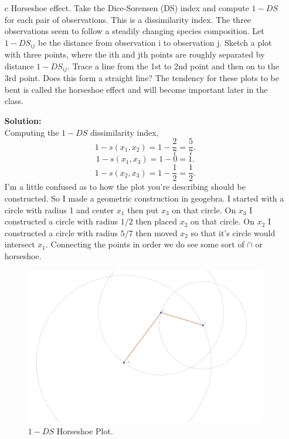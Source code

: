 \documentclass[12pt]{article}
\makeatletter
\theoremstyle{homework}
\newenvironment{exercise}[1]
{\def\@currentlabel{#1}\exercisecore}
{\endexercisecore}
\newcommand{\localhead}[1]{\par\smallskip\noindent\textbf{#1}\nobreak\\}%
\newcommand\solution{\localhead{Solution:}}
\makeatother
\begin{document}
\begin{exercise}{2}
\begin{exercise}{3}
\begin{enumerate}
      \item[c]  Horseshoe effect. Take the Dice-Sorensen (DS) index and compute $1 - DS$ for each pair 
      of observations. This is a dissimilarity index. The three observations seem to follow a 
      steadily changing species composition. Let $1 - DS_{ij}$ be the distance from observation i to 
      observation j.  Sketch a plot with three points, where the ith and jth points are roughly 
      separated by distance $1 - DS_{ij}$.  Trace a line from the 1st to 2nd point and then on to the 
      3rd point.  Does this form a straight line?  The tendency for these plots to be bent is 
      called the horseshoe effect and will become important later in the class.\\
      \solution Computing the $1 - DS$ dissimilarity index, 
      \begin{equation*}
        1 - s(x_1, x_2) = 1 - \dfrac{2}{7} = \dfrac{5}{7}.
      \end{equation*}
      \begin{equation*}
        1 - s(x_1, x_3) = 1 - 0 = 1.
      \end{equation*}
      \begin{equation*}
        1 - s(x_2, x_3) = 1 - \dfrac{1}{2} = \dfrac{1}{2}.
      \end{equation*}
      I'm a little confused as to how the plot you're describing should be constructed. So I made a geometric construction in geogebra. I started with a circle with radius 1 and center 
      $x_1$ then put $x_3$ on that circle. On $x_3$ I constructed a circle with radius $1/2$ then placed $x_2$ on that circle. On $x_2$ I constructed a circle with radius $5/7$ then moved 
      $x_2$ so that it's circle would intersect $x_1$. Connecting the points in order we do see some sort of $\cap$ or horseshoe.
      \begin{figure}[H]
        \begin{center}
          \caption{$1 - DS$ Horseshoe Plot.}
        \includegraphics[width = \textwidth]{Horseshoe.png}
        \end{center}
      \end{figure}  
          

\end{enumerate}
\end{exercise}
\end{exercise}
\end{document}
